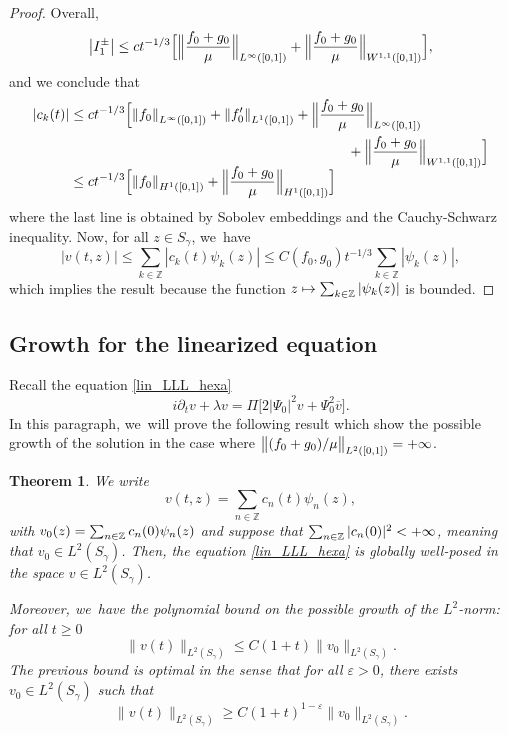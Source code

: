 \documentclass[10pt]{amsart}
\newcommand\mto{\mathchoice{\longmapsto}{\mapsto}{\mapsto}{\mapsto}}
\newtheorem{theorem}{Theorem}[section]
\theoremstyle{definition}
\let\eps\varepsilon
\let\dis\relax
\let\ov\overline
\newcommand\Z{\mathbb Z}
\newcommand{\Bpac}[1]{\Bigl[#1\Bigr]}
\newcommand{\abs}[1]{\left|#1\right|}
\newcommand{\absabs}[1]{\left\|#1\right\|}
\newcommand{\Babsabs}[1]{\Bigl\|#1\Bigr\|}
\begin{document}
\begin{proof}
Overall,
\begin{equation}\label{Int4}
\abs{I_1^\pm} \leq {c}{t^{-1/3}} \Bpac{\Babsabs{\frac{{f}_0+{g}_0}{\mu} }_{L^\infty([0,1])} + \Babsabs{\frac{{f}_0+{g}_0}{\mu} }_{W^{1,1}([0,1])}},
\end{equation}
and we conclude that
\begin{align*}
|c_k(t)| &\leq {c}{t^{-1/3}} \Bpac{\absabs{{f}_0 }_{L^\infty([0,1])} + \absabs{{f}_0'}_{L^1([0,1])}+\Babsabs{\frac{{f}_0+{g}_0}{\mu} }_{L^\infty([0,1])}\\
&\hspace*{7cm}+ \Babsabs{\frac{{f}_0+{g}_0}{\mu} }_{W^{1,1}([0,1])}} \\[-5pt]
&\leq {c}{t^{-1/3}} \Bpac{\absabs{{f}_0}_{H^1([0,1])}+ \Babsabs{\frac{{f}_0+{g}_0}{\mu} }_{H^1([0,1])}}
\end{align*}
where the last line is obtained by Sobolev embeddings and the Cauchy-Schwarz inequality. Now, for all $z \in S_{\gamma}$, we~have
\begin{equation*}
|v(t,z)| \leq \sum_{k\in\Z}|c_k(t)\psi_k(z)| \leq {C({f}_0,{g}_0)}{t^{-1/3}}\sum_{k\in\Z}|\psi_k(z)|,
\end{equation*}
which implies the result because the function $\dis z \mto \sum_{k\in\Z}|\psi_k(z)|$ is bounded.
\end{proof}

\subsection{Growth for the linearized equation}

Recall the equation \eqref{lin_LLL_hexa}
\begin{equation*}
i\partial_t v + \lambda v = \Pi\big[2|\Psi_0|^2v+\Psi_0^2\ov{v}\big].
\end{equation*}
In this paragraph, we~will prove the following result which show the possible growth of the solution in the case where $ \dis \big\| ({{f}_0+{g}_0})/{\mu} \big\|_{L^2([0, 1])}=+\infty$.

\begin{theorem}\label{thm_borne}
We write
\[
v(t,z) = \sum_{n\in\Z} c_n(t) \psi_n(z), 
\]
with $\dis v_0(z) = \sum_{n\in\Z} c_n(0) \psi_n(z)$ and suppose that $ \dis \sum_{n \in \Z} |c_n(0)|^2 < +\infty$, meaning that $v_0 \in L^2(S_{\gamma})$. Then, the equation \eqref{lin_LLL_hexa} is globally well-posed in the space $v \in L^2(S_{\gamma})$. 

Moreover, we~have the polynomial bound on the possible growth of the $L^2$-norm: for all $t\geq 0$
\begin{equation}\label{bound00}
\|v(t)\|_{L^2(S_\gamma)} \leq C(1+t) \|v_0\|_{L^2(S_\gamma)}.
\end{equation}
The previous bound is optimal in the sense that for all $\eps>0$, there exists $v_0 \in L^2(S_{\gamma})$ such that
\begin{equation*}
\|v(t)\|_{L^2(S_\gamma)} \geq C(1+t)^{1-\eps} \|v_0\|_{L^2(S_\gamma)}.
\end{equation*}
\end{theorem}
\end{document}
